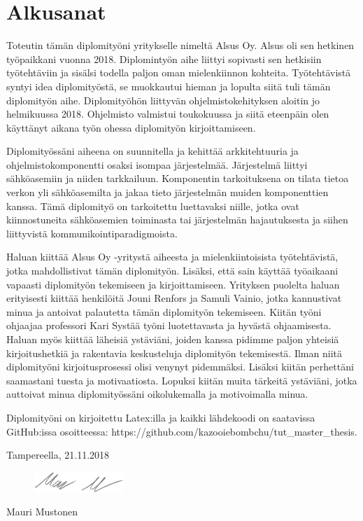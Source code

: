 \chapter*{Alkusanat}
\label{ch:alkusanat}
Toteutin tämän diplomityöni yritykselle nimeltä Alsus Oy. Alsus oli sen hetkinen työpaikkani vuonna 2018. Diplomintyön aihe liittyi sopivasti sen hetkisiin työtehtäviin ja sisälsi todella paljon oman mielenkiinnon kohteita. Työtehtävistä syntyi idea diplomityöstä, se muokkautui hieman ja lopulta siitä tuli tämän diplomityön aihe. Diplomityöhön liittyvän ohjelmistokehityksen aloitin jo helmikuussa 2018. Ohjelmisto valmistui toukokuussa ja siitä eteenpäin olen käyttänyt aikana työn ohessa diplomityön kirjoittamiseen.

Diplomityössäni aiheena on suunnitella ja kehittää arkkitehtuuria ja ohjelmistokomponentti osaksi isompaa järjestelmää. Järjestelmä liittyi sähköasemiin ja niiden tarkkailuun. Komponentin tarkoituksena on tilata tietoa verkon yli sähköasemilta ja jakaa tieto järjestelmän muiden komponenttien kanssa. Tämä diplomityö on tarkoitettu luettavaksi niille, jotka ovat kiinnostuneita sähköasemien toiminasta tai järjestelmän hajautuksesta ja siihen liittyvistä kommunikointiparadigmoista.

Haluan kiittää Alsus Oy -yritystä aiheesta ja mielenkiintoisista työtehtävistä, jotka mahdollistivat tämän diplomityön. Lisäksi, että sain käyttää työaikaani vapaasti diplomityön tekemiseen ja kirjoittamiseen. Yrityksen puolelta haluan erityisesti kiittää henkilöitä Jouni Renfors ja Samuli Vainio, jotka kannustivat minua ja antoivat palautetta tämän diplomityön tekemiseen. Kiitän työni ohjaajaa professori Kari Systää työni luotettavasta ja hyvästä ohjaamisesta. Haluan myös kiittää läheisiä ystäviäni, joiden kanssa pidimme paljon yhteisiä kirjoitushetkiä ja rakentavia keskusteluja diplomityön tekemisestä. Ilman niitä diplomityöni kirjoitusprosessi olisi venynyt pidemmäksi. Lisäksi kiitän perhettäni saamastani tuesta ja motivaatiosta. Lopuksi kiitän muita tärkeitä ystäviäni, jotka auttoivat minua diplomityössäni oikolukemalla ja motivoimalla minua.

Diplomityöni on kirjoitettu Latex:illa ja kaikki lähdekoodi on saatavissa GitHub:issa osoitteessa: https://github.com/kazooiebombchu/tut\_master\_thesis.

\vspace{2\baselineskip}

Tampereella, 21.11.2018

\begin{figure}[ht!]
	\includegraphics[width=0.3\textwidth,left]{pictures/signature.png}
\end{figure}

Mauri Mustonen